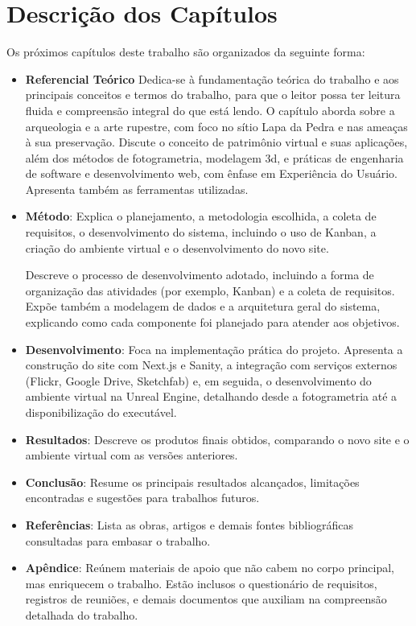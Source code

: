 \section{Descrição dos Capítulos}
Os próximos capítulos deste trabalho são organizados da seguinte forma:
\begin{itemize}
    \item \textbf{Referencial Teórico}
    Dedica-se à fundamentação teórica do trabalho e aos principais conceitos e termos do trabalho, para que o leitor possa ter leitura fluida e compreensão integral do que está lendo. O capítulo aborda sobre a arqueologia e a arte rupestre, com foco no sítio Lapa da Pedra e nas ameaças à sua preservação. Discute o conceito de patrimônio virtual e suas aplicações, além dos métodos de fotogrametria, modelagem \gls{3d}, e práticas de engenharia de software e desenvolvimento web, com ênfase em Experiência do Usuário. Apresenta também as ferramentas utilizadas.
    
    \item \textbf{Método}: Explica o planejamento, a metodologia escolhida, a coleta de requisitos, o desenvolvimento do sistema, incluindo o uso de Kanban, a criação do ambiente virtual e o desenvolvimento do novo site.
    
    Descreve o processo de desenvolvimento adotado, incluindo a forma de organização das atividades (por exemplo, Kanban) e a coleta de requisitos. Expõe também a modelagem de dados e a arquitetura geral do sistema, explicando como cada componente foi planejado para atender aos objetivos.
    
    \item \textbf{Desenvolvimento}: Foca na implementação prática do projeto. Apresenta a construção do site com Next.js e Sanity, a integração com serviços externos (Flickr, Google Drive, Sketchfab) e, em seguida, o desenvolvimento do ambiente virtual na Unreal Engine, detalhando desde a 
    fotogrametria até a disponibilização do executável.
    
    \item \textbf{Resultados}: Descreve os produtos finais obtidos, comparando o novo site e o ambiente virtual com as versões anteriores.
    \item \textbf{Conclusão}: Resume os principais resultados alcançados, limitações encontradas e sugestões para trabalhos futuros.
    \item \textbf{Referências}: Lista as obras, artigos e demais fontes bibliográficas consultadas para embasar o trabalho.
    \item \textbf{Apêndice}: Reúnem materiais de apoio que não cabem no corpo principal, mas enriquecem o trabalho. Estão inclusos o questionário de requisitos, registros de reuniões, e demais documentos que auxiliam na compreensão detalhada do trabalho.


\end{itemize}

